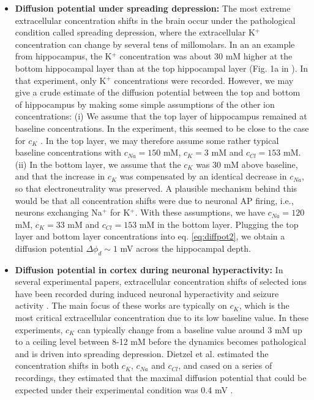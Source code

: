 \begin{itemize}

\item {\bf Diffusion potential under spreading depression:} The most extreme extracellular concentration shifts in the brain occur under the pathological condition called spreading depression, where the extracellular K$^+$ concentration can change by several tens of millomolars. In an an example from hippocampus, the K$^+$ concentration was about 30 mM higher at the bottom hippocampal layer than at the top hippocampal layer (Fig. 1a in \cite{Herreras1993}). In that experiment, only K$^+$ concentrations were recorded. However, we may give a crude estimate of the diffusion potential between the top and bottom of hippocampus by making some simple assumptions of the other ion concentrations: (i) We assume that the top layer of hippocampus remained at baseline concentrations. In the experiment, this seemed to be close to the case for $c_K$ \cite{Herreras1993}. In the top layer, we may therefore assume some rather typical baseline concentrations with $c_{Na} = 150$ mM, $c_{K} = 3$ mM and $c_{Cl} = 153$ mM. (ii) In the bottom layer, we assume that the $c_K$ was 30 mM above baseline, and that the increase in $c_K$ was compensated by an identical decrease in $c_{Na}$, so that electroneutrality was preserved. A plausible mechanism behind this would be that all concentration shifts were due to neuronal AP firing, i.e., neurons exchanging Na$^+$ for K$^+$. With these assumptions, we have $c_{Na} = 120$ mM, $c_{K} = 33$ mM and $c_{Cl} = 153$ mM in the bottom layer. Plugging the top layer and bottom layer concentrations into eq. \ref{eq:diffpot2}, we obtain a diffusion potential $\Delta \phi_d \sim 1$ mV across the hippocampal depth.

\item {\bf Diffusion potential in cortex during neuronal hyperactivity:} In several experimental papers, extracellular concentration shifts of selected ions have been recorded during induced neuronal hyperactivity and seizure activity \cite{kriv1975, nicholson1978, Dietzel1982, somjen1986, Dietzel1989}. The main focus of these works are typically on $c_K$, which is the most critical extracellular concentration due to its low baseline value. In these experiments, $c_K$ can typically change from a baseline value around 3 mM up to a ceiling level between 8-12 mM before the dynamics becomes pathological and is driven into spreading depression. Dietzel et al. estimated the concentration shifts in both $c_{K}$, $c_{Na}$ and $c_{Cl}$, and cased on a series of recordings, they estimated that the maximal diffusion potential that could be expected under their experimental condition was 0.4 mV \cite{Dietzel1989}.


\end{itemize}
